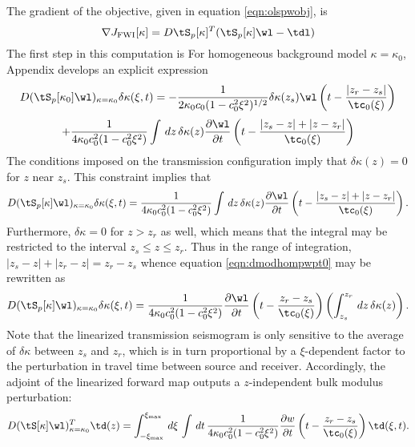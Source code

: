 The gradient of the objective, given in equation \ref{eqn:olspwobj},
is
\begin{equation}
  \label{eqn:fwigrad}
  \nabla J_{\rm FWI}[\kappa] = D\tS_p[\kappa]^T(\tS_p[\kappa]\wl-\tdl)
\end{equation}
The first step in this computation is 
For homogeneous background model $\kappa=\kappa_0$, Appendix \appPlane
develops an explicit expression 
\[
D(\tS_p[\kappa_0]\wl)_{\kappa=\kappa_0}\delta \kappa(\xi,t) =
  -\frac{1}{2\kappa_0c_0(1-c_0^2\xi^2)^{1/2}} \delta 
  \kappa(z_s) \wl\left(t - \frac{|z_r-z_s|}{\tc_0(\xi)}\right)
\]
\begin{equation}
\label{eqn:dmodhompwpt}
    + \frac{1}{4\kappa_0c_0^2(1-c_0^2\xi^2)} \int \,dz\,\delta 
  \kappa(z) \frac{\partial \wl}{\partial
    t}\left(t - \frac{|z_s-z|+|z-z_r|}{\tc_0(\xi)}\right)
\end{equation}
The conditions imposed on the transmission configuration imply that
$\delta \kappa(z) = 0$ for $z$ near $z_s$. This constraint implies that
\begin{equation}
  \label{eqn:dmodhompwpt0}
  D(\tS_p[\kappa]\wl)_{\kappa=\kappa_0}\delta \kappa(\xi,t) =
     \frac{1}{4\kappa_0c_0^2(1-c_0^2\xi^2)} \int \,dz\,\delta 
  \kappa(z)  \frac{\partial \wl}{\partial 
    t}\left(t - \frac{|z_s-z|+|z-z_r|}{\tc_0(\xi)}\right). 
\end{equation}
Furthermore, $\delta \kappa = 0$ for $z>z_r$ as well, which means that
the integral may be restricted to the interval $z_s \le z \le
z_r$. Thus in the range of integration, $|z_s-z| + |z_r-z|=z_r-z_s$
whence equation \ref{eqn:dmodhompwpt0} may be rewritten as
\begin{equation}
  \label{eqn:dmodhompwpt1}
  D(\tS_p[\kappa]\wl)_{\kappa=\kappa_0}\delta \kappa(\xi,t) =
     \frac{1}{4\kappa_0c_0^2(1-c_0^2\xi^2)} \frac{\partial \wl}{\partial 
    t}\left(t - \frac{z_r-z_s}{\tc_0(\xi)}\right) \left(\int_{z_s}^{z_r} \,dz\,\delta 
  \kappa(z) \right). 
\end{equation}
Note that the linearized transmission seismogram is only sensitive to
the average of $\delta \kappa$ between $z_s$ and $z_r$, which is in
turn proportional by a $\xi$-dependent factor to the perturbation in
travel time between source and receiver. Accordingly, the adjoint of
the linearized forward map outputs a $z$-independent bulk modulus perturbation:
\begin{equation}
\label{eqn:dmodhompwptadj}
D(\tS[\kappa]\wl)_{\kappa=\kappa_0}^T\td(z) =
\int_{-\xi_{\rm max}}^{\xi_{\rm max}}\,d\xi\,\int\,dt\,
\frac{1}{4\kappa_0c_0^2(1-c_0^2\xi^2)}
\frac{\partial w}{\partial
    t}\left(t - \frac{z_r-z_s}{\tc_0(\xi)}\right) \td(\xi,t).
\end{equation}

